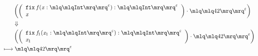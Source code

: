 \documentclass{article}
\begin{document}
\tiny\begin{align*}
&\left(\left(\begin{array}{l} \mathtt{fix}\; \mathit{f}(\mathit{x}:\quot{\mathtt{Int}}^{\varepsilon}): \quot{\mathtt{Int}}^{\varepsilon}\\\mathit{x}\end{array}\right)\cdot \quot{42}^{\varepsilon}\right)\\ 
&\Downarrow\\ 
&\left(\left(\begin{array}{l} \mathtt{fix}\; \mathit{f}_{1}(\mathit{x}_{1}:\quot{\mathtt{Int}}^{\varepsilon}): \quot{\mathtt{Int}}^{\varepsilon}\\\mathit{x}_{1}\end{array}\right)\cdot \quot{42}^{\varepsilon}\right)\\ 
\longmapsto &\;\quot{42}^{\varepsilon}\\ 
\end{align*}
\end{document}

